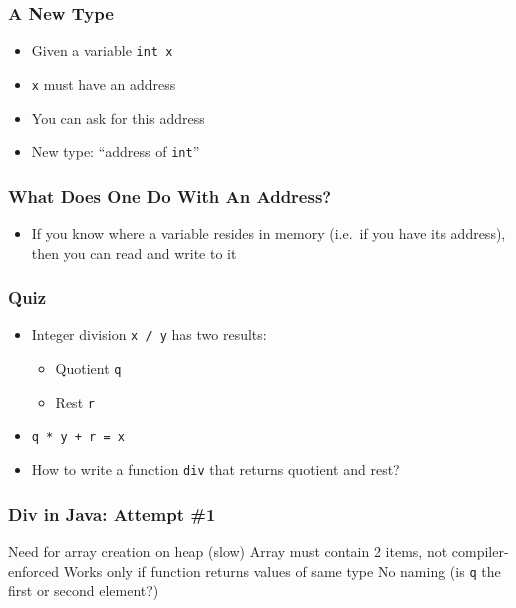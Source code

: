 \begin{frame}
  \frametitle{A New Type}
  \begin{itemize}
    \item Given a variable {\tt int x}
    \item {\tt x} must have an address
    \item You can ask for this address
    \item New type: ``address of {\tt int}''
  \end{itemize}
  \vskip1cm
\end{frame}

\begin{frame}
  \frametitle{What Does One Do With An Address?}
  \begin{itemize}
  \item If you know where a variable resides in memory
        (i.e.\ if you have its address), then you can read and write to it
  \end{itemize}
  \vskip1cm
\end{frame}

\begin{frame}
  \frametitle{Quiz}
  \begin{itemize}
    \item Integer division {\tt x / y} has two results:
          \begin{itemize}
            \item Quotient {\tt q}
            \item Rest {\tt r}
          \end{itemize}
    \item {\tt q * y + r = x}
    \item How to write a function {\tt div} that returns quotient and rest?
  \end{itemize}
\end{frame}

\begin{frame}
  \frametitle{Div in Java: Attempt \#1}
  \vskip5mm
  \begin{procontralist}
     Need for array creation on heap (slow)
     Array must contain 2 items, not compiler-enforced
     Works only if function returns values of same type
     No naming (is {\tt q} the first or second element?)
  \end{procontralist}
\end{frame}


